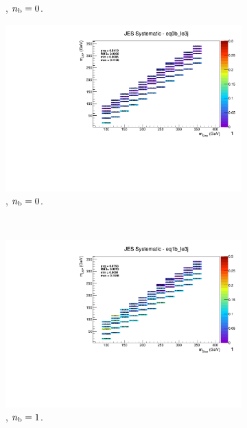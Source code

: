 \begin{figure}[ht!]
\begin{subfigure}[b]{0.32\textwidth}
    \caption{\njlow, $n_{\text{b}} = 0$.}
  \end{subfigure}
  \begin{subfigure}[b]{0.32\textwidth}
    \includegraphics[width=\textwidth, page=1]{Figs/sms/t2cc/v37/systs_v2/T2cc_JES_eq0b_le3j.pdf}
    \caption{\njlow, $n_{\text{b}} = 0$.}
    \label{fig:sms-jes-t2cc-le3j-0b}
  \end{subfigure}\\
  \begin{subfigure}[b]{0.32\textwidth}
    \includegraphics[width=\textwidth, page=12]{Figs/sms/t2cc/v37/systs_v2/T2cc_JES_eq1b_le3j.pdf}
    \caption{\njlow, $n_{\text{b}} = 1$.}
  \end{subfigure}
  \begin{subfigure}[b]{0.32\textwidth}

\end{subfigure}
\end{figure}
